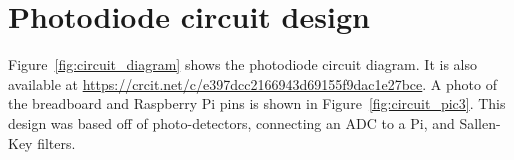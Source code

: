 \documentclass[paper-main.tex]{subfiles}
\begin{document}





\section{Photodiode circuit design}
\label{app:circuit_diagram}

Figure~\ref{fig:circuit_diagram} shows the photodiode circuit diagram. 
It is also available at \url{https://crcit.net/c/e397dcc2166943d69155f9dac1e27bce}. A photo of the breadboard and Raspberry Pi pins is shown in Figure~\ref{fig:circuit_pic3}. This design was based off  of photo-detectors, connecting an ADC to a Pi, and Sallen-Key filters.
\end{document}
